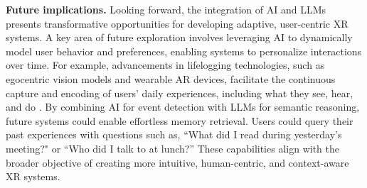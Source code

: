 \documentclass[review]{fcs}
\newcommand{\revise}[2]{\textcolor[rgb]{0,0,0}{#2}}
\begin{document}
\revise{}{\textbf{Future implications.} Looking forward, the integration of AI and LLMs presents transformative opportunities for developing adaptive, user-centric XR systems. A key area of future exploration involves leveraging AI to dynamically model user behavior and preferences, enabling systems to personalize interactions over time. For example, advancements in lifelogging technologies, such as egocentric vision models and wearable AR devices, facilitate the continuous capture and encoding of users’ daily experiences, including what they see, hear, and do \cite{DBLP:conf/chi/0005WBCRF24}. 
By combining AI for event detection with LLMs for semantic reasoning, future systems could enable effortless memory retrieval. Users could query their past experiences with questions such as, ``What did I read during yesterday’s meeting?" or ``Who did I talk to at lunch?” These capabilities align with the broader objective of creating more intuitive, human-centric, and context-aware XR systems. }






\end{document}

